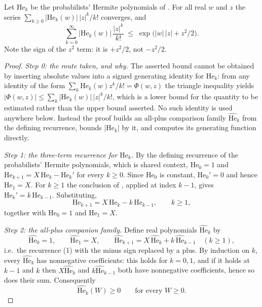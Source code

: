 \begin{lemma}
Let $\mathrm{He}_k$ be the probabilists' Hermite polynomials of
.  For all real $w$ and $z$ the series
$\sum_{k\geq0} |\mathrm{He}_k(w)|\,|z|^k/k!$ converges, and
\[
  \sum_{k=0}^\infty \bigl|\mathrm{He}_k(w)\bigr|\,\frac{|z|^k}{k!}
    \;\leq\; \exp\bigl(|w|\,|z| + z^2/2\bigr) .
\]
Note the sign of the $z^2$ term: it is $+z^2/2$, not $-z^2/2$.
\end{lemma}
\begin{proof}
\emph{Step 0: the route taken, and why.}
The asserted bound cannot be obtained by inserting absolute values into a signed
generating identity for $\mathrm{He}_k$: from any identity of the form
$\sum_k \mathrm{He}_k(w) z^k/k! = \Phi(w,z)$ the triangle inequality yields
$|\Phi(w,z)| \leq \sum_k |\mathrm{He}_k(w)|\,|z|^k/k!$, which is a lower bound for
the quantity to be estimated rather than the upper bound asserted.  No such
identity is used anywhere below.  Instead the proof builds an all-plus
comparison family $\widehat{\mathrm{He}}_k$ from the defining recurrence, bounds
$|\mathrm{He}_k|$ by it, and computes its generating function directly.

\emph{Step 1: the three-term recurrence for $\mathrm{He}_k$.}
By the defining recurrence of the probabilists' Hermite polynomials, which is
shared context, $\mathrm{He}_0 = 1$ and
$\mathrm{He}_{k+1} = X\,\mathrm{He}_k - \mathrm{He}_k'$ for every $k \geq 0$.  Since $\mathrm{He}_0$ is constant, $\mathrm{He}_0' = 0$ and
hence $\mathrm{He}_1 = X$.  For $k \geq 1$ the conclusion of
, applied at index $k-1$, gives
$\mathrm{He}_k' = k\,\mathrm{He}_{k-1}$.  Substituting,
\begin{equation*}
  \mathrm{He}_{k+1} = X\,\mathrm{He}_k - k\,\mathrm{He}_{k-1},
  \qquad k \geq 1, \tag{1}
\end{equation*}
together with $\mathrm{He}_0 = 1$ and $\mathrm{He}_1 = X$.

\emph{Step 2: the all-plus companion family.}
Define real polynomials $\widehat{\mathrm{He}}_k$ by
\[
  \widehat{\mathrm{He}}_0 = 1,
  \qquad
  \widehat{\mathrm{He}}_1 = X,
  \qquad
  \widehat{\mathrm{He}}_{k+1} = X\,\widehat{\mathrm{He}}_k + k\,\widehat{\mathrm{He}}_{k-1}
  \quad (k \geq 1),
\]
i.e.\ the recurrence (1) with the minus sign replaced by a plus.  By induction on
$k$, every $\widehat{\mathrm{He}}_k$ has nonnegative coefficients: this holds for
$k = 0, 1$, and if it holds at $k-1$ and $k$ then $X\widehat{\mathrm{He}}_k$ and
$k\widehat{\mathrm{He}}_{k-1}$ both have nonnegative coefficients, hence so does
their sum.  Consequently
\begin{equation*}
  \widehat{\mathrm{He}}_k(W) \geq 0 \qquad\text{for every } W \geq 0 . \tag{2}
\end{equation*}


\end{proof}
